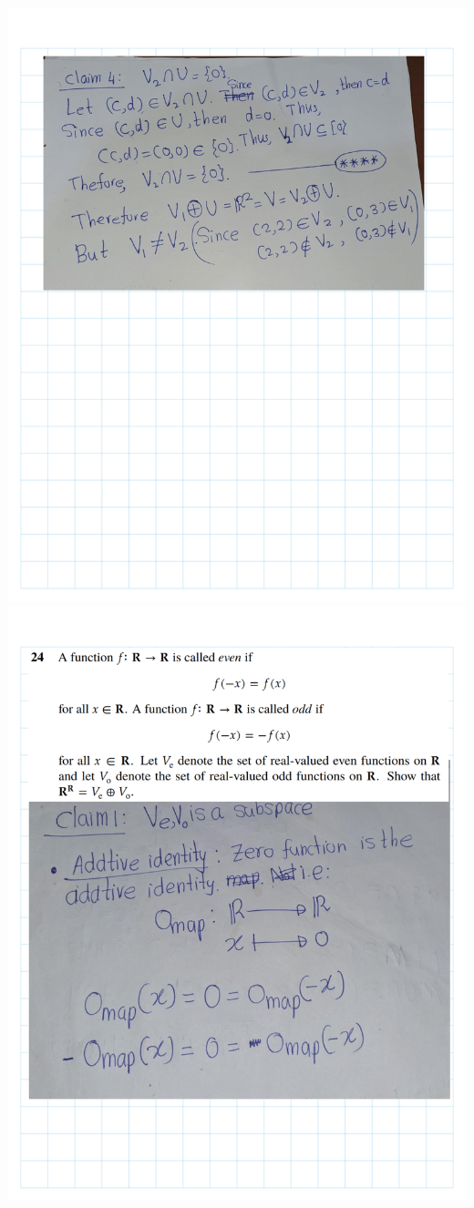 \documentclass[
]{book}
\theoremstyle{definition}
\theoremstyle{definition}
\theoremstyle{definition}
\theoremstyle{definition}
\theoremstyle{remark}
\begin{document}
\begin{enumerate}
  \includegraphics{fig/Ex1C/Ex/Ex-30.png} \includegraphics{fig/Ex1C/Ex/Ex-31.png}

\end{enumerate}
\end{document}
